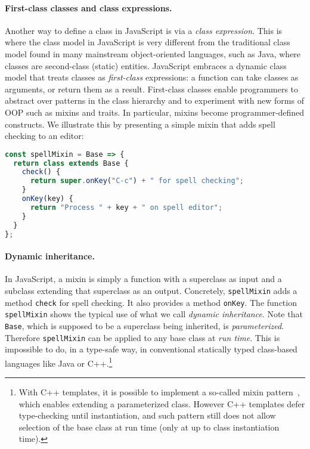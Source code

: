 \paragraph{First-class classes and class expressions.}

Another way to define a class in JavaScript is via a \emph{class expression}. This is where the class
model in JavaScript is very different from the traditional class model found in
many mainstream object-oriented languages, such as Java, where classes are second-class
(static) entities. JavaScript embraces a dynamic class model that treats classes
as \emph{first-class} expressions: a function can take classes as arguments,
or return them as a result. First-class classes enable programmers to
abstract over patterns in the class hierarchy and to experiment with new forms of OOP
such as mixins and traits. In particular, mixins become programmer-defined
constructs. We illustrate this by presenting a simple mixin that adds
spell checking to an editor:
\begin{lstlisting}[language=JavaScript]
const spellMixin = Base => {
  return class extends Base {
    check() {
      return super.onKey("C-c") + " for spell checking";
    }
    onKey(key) {
      return "Process " + key + " on spell editor";
    }
  }
};
\end{lstlisting}

\paragraph{Dynamic inheritance.}

In JavaScript, a mixin is simply a function with a superclass as input and a
subclass extending that superclass as an output. Concretely, \lstinline{spellMixin}
adds a method \lstinline{check} for spell checking. It also provides
a method \lstinline{onKey}.
The function \lstinline{spellMixin} shows the typical use of what we call \emph{dynamic inheritance}.
Note that \lstinline{Base}, which is supposed to be a superclass being inherited, is \emph{parameterized}.
Therefore \lstinline{spellMixin} can be applied to any base class at
\emph{run time}. This is impossible to do, in a type-safe way, in
conventional statically typed class-based languages like Java or
C++.\footnote{With C++ templates, it is possible to
  implement a so-called mixin pattern~\citep{DBLP:conf/gcse/SmaragdakisB00}, which enables extending
a parameterized class. However C++ templates defer type-checking until
instantiation, and such pattern still does not allow selection of the
base class at run time (only at up to class instantiation time).}


